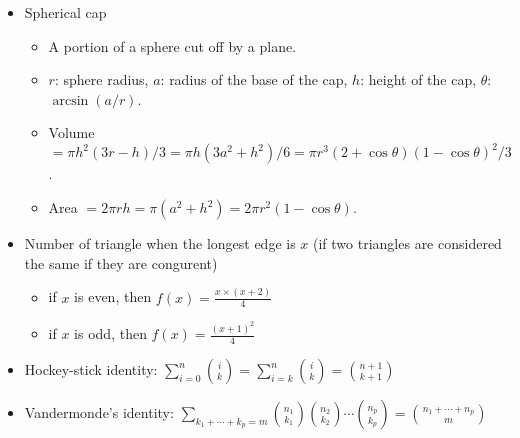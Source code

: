 \begin{itemize}
\item Spherical cap

\begin{itemize}
    \itemsep-0.5em
  \item A portion of a sphere cut off by a plane.
  \item $r$: sphere radius, $a$: radius of the base of the cap, $h$: height of the cap, $\theta$: $\arcsin(a/r)$.
  \item Volume $=\pi h^2(3r-h)/3=\pi h(3a^2+h^2)/6=\pi r^3(2+\cos\theta)(1-\cos\theta)^2/3$.
  \item Area $=2\pi rh=\pi(a^2+h^2)=2\pi r^2(1-\cos\theta)$.
\end{itemize}

\item Number of triangle when the longest edge is $x$ (if two triangles are considered the same if they are congurent)
\begin{itemize}
    \itemsep-0.5em
  \item if $x$ is even, then $f(x) = \frac{x \times (x + 2)}{4}$
  \item if $x$ is odd, then $f(x) = \frac{(x + 1)^2}{4}$
\end{itemize}

\item Hockey-stick identity: $\displaystyle\sum_{i = 0}^n {i\choose k} = \displaystyle\sum_{i = k}^n {i \choose k} = {{n + 1}\choose{k + 1}}$

\item Vandermonde's identity: $\displaystyle\sum_{k_1 + \cdots + k_p = m} {{n_1}\choose{k_1}}{{n_2}\choose{k_2}} \cdots {{n_p}\choose{k_p}} = {{n_1 + \cdots + n_p}\choose m}$

\end{itemize}



